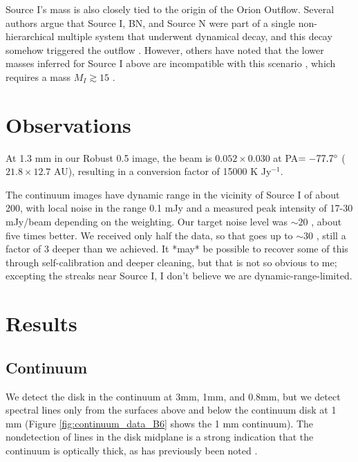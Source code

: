 \documentclass[twocolumn]{aastex61}
\begin{document}
Source I's mass is also closely tied to the origin of the Orion Outflow.
Several authors argue that Source I, BN, and Source N \citep[or, alternatively,
source X][]{Luhman2017a} were part of a single non-hierarchical multiple system
that underwent dynamical decay, and this decay somehow triggered the outflow
\citep{Bally2005a,Rodriguez2005a,Goddi2010a,Bally2011a,Bally2015a,Bally2017a}.
However, others have
noted that the lower masses inferred for Source I above are incompatible with
this scenario \citep{Chatterjee2012a,Farias2017a,Plambeck2016a}, which requires
a mass $M_{I} \gtrsim 15$ \msun.

\section{Observations}

At 1.3 mm in our Robust 0.5 image, the beam is $0.052\times0.030$ \arcsec at
PA$=-77.7^{\circ}$ ($21.8\times12.7$ AU), resulting in a 
conversion factor of 15000 K Jy$^{-1}$.




The continuum images have dynamic range in the vicinity of Source I of about 200,
with local noise in the range 0.1 mJy \perbeam and a measured peak intensity of 17-30
mJy/beam depending on the weighting.
{\color{red} Our target noise level was $\sim20$ \microJy \perbeam,
about five times better.  We received only half the data, so that goes up to $\sim30$
\microJy \perbeam, still a factor of 3 deeper than we achieved.  It *may* be possible
to recover some of this through self-calibration and deeper cleaning, but that
is not so obvious to me; excepting the streaks near Source I, I don't believe
we are dynamic-range-limited.}




\section{Results}

\subsection{Continuum}
We detect the disk in the continuum at 3mm, 1mm, and 0.8mm, but we detect
spectral lines only from the surfaces above and below the continuum disk at 1
mm (Figure \ref{fig:continuum_data_B6} shows the 1 mm continuum).  The nondetection of
lines in the disk midplane is a strong indication that the continuum is
optically thick, as has previously been noted
\citep[e.g.][]{Plambeck2016a}.
\end{document}
